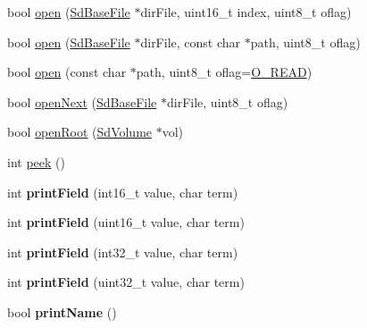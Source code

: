 \begin{DoxyCompactItemize}
\item 
bool \hyperlink{class_sd_base_file_a6ff5b48f672515ec20831583de74407f}{open} (\hyperlink{class_sd_base_file}{Sd\+Base\+File} $\ast$dir\+File, uint16\+\_\+t index, uint8\+\_\+t oflag)
\item 
bool \hyperlink{class_sd_base_file_a4b88be0d893bcada9b203bdd33fff8e2}{open} (\hyperlink{class_sd_base_file}{Sd\+Base\+File} $\ast$dir\+File, const char $\ast$path, uint8\+\_\+t oflag)
\item 
bool \hyperlink{class_sd_base_file_a63854cd9c57a9910779ca22112b436e0}{open} (const char $\ast$path, uint8\+\_\+t oflag=\hyperlink{_sd_base_file_8h_ac5a1c3e543273b0374ba114c496e662e}{O\+\_\+\+R\+E\+AD})
\item 
bool \hyperlink{class_sd_base_file_aee4c736345e96aa5ddb7e5768ce88f51}{open\+Next} (\hyperlink{class_sd_base_file}{Sd\+Base\+File} $\ast$dir\+File, uint8\+\_\+t oflag)
\item 
bool \hyperlink{class_sd_base_file_ac67ffdfb84263bcd425886c09a15e287}{open\+Root} (\hyperlink{class_sd_volume}{Sd\+Volume} $\ast$vol)
\item 
int \hyperlink{class_sd_base_file_a996abee868ce928d04d9d0ad9305c915}{peek} ()
\item 
int {\bfseries print\+Field} (int16\+\_\+t value, char term)\hypertarget{class_sd_base_file_a8fcc3db8e05121c739d8d43ee40fec72}{}\label{class_sd_base_file_a8fcc3db8e05121c739d8d43ee40fec72}

\item 
int {\bfseries print\+Field} (uint16\+\_\+t value, char term)\hypertarget{class_sd_base_file_a71050abe5bed8e44f48ae75627b54c63}{}\label{class_sd_base_file_a71050abe5bed8e44f48ae75627b54c63}

\item 
int {\bfseries print\+Field} (int32\+\_\+t value, char term)\hypertarget{class_sd_base_file_a770817e273c68fb830f9f029c39fc41c}{}\label{class_sd_base_file_a770817e273c68fb830f9f029c39fc41c}

\item 
int {\bfseries print\+Field} (uint32\+\_\+t value, char term)\hypertarget{class_sd_base_file_a27146777c4d215cb5887edab4b4599b0}{}\label{class_sd_base_file_a27146777c4d215cb5887edab4b4599b0}

\item 
bool {\bfseries print\+Name} ()\hypertarget{class_sd_base_file_a239cacb867f6c4f93eb52c38c60684d7}{}\label{class_sd_base_file_a239cacb867f6c4f93eb52c38c60684d7}


\end{DoxyCompactItemize}
